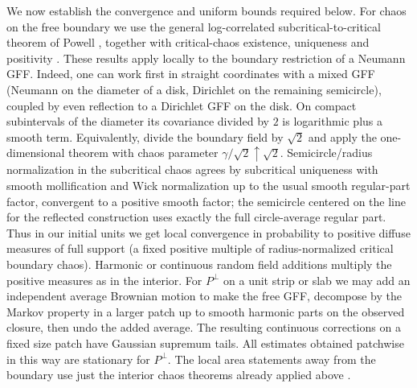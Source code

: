 We now establish the convergence and uniform bounds required below.
For chaos on the free boundary we use the general log-correlated subcritical-to-critical theorem of Powell \citep[Theorem~3.1]{PowellReview}, together with critical-chaos existence, uniqueness and positivity \citep[Theorems~5.3--5.4]{JSWchaos}.  These results apply locally to the boundary restriction of a Neumann GFF.
Indeed, one can work first in straight coordinates with a mixed GFF (Neumann on the diameter of a disk, Dirichlet on the remaining semicircle), coupled by even reflection to a Dirichlet GFF on the disk.
On compact subintervals of the diameter its covariance divided by $2$ is logarithmic plus a smooth term.  Equivalently, divide the boundary field by $\sqrt2$ and apply the one-dimensional theorem with chaos parameter $\gamma/\sqrt2\uparrow\sqrt2$.
Semicircle/radius normalization in the subcritical chaos agrees by subcritical uniqueness with smooth mollification and Wick normalization up to the usual smooth regular-part factor, convergent to a positive smooth factor; the semicircle centered on the line for the reflected construction uses exactly the full circle-average regular part.
Thus in our initial units we get local convergence in probability to positive diffuse measures of full support (a fixed positive multiple of radius-normalized critical boundary chaos).
Harmonic or continuous random field additions multiply the positive measures as in the interior.
For \(P^\perp\) on a unit strip or slab we may add an independent average Brownian motion to make the free GFF, decompose by the Markov property in a larger patch up to smooth harmonic parts on the observed closure, then undo the added average.
The resulting continuous corrections on a fixed size patch have Gaussian supremum tails.
All estimates obtained patchwise in this way are stationary for \(P^\perp\).
The local area statements away from the boundary use just the interior chaos theorems already applied above \citep{PowellReview,JSWchaos}.

